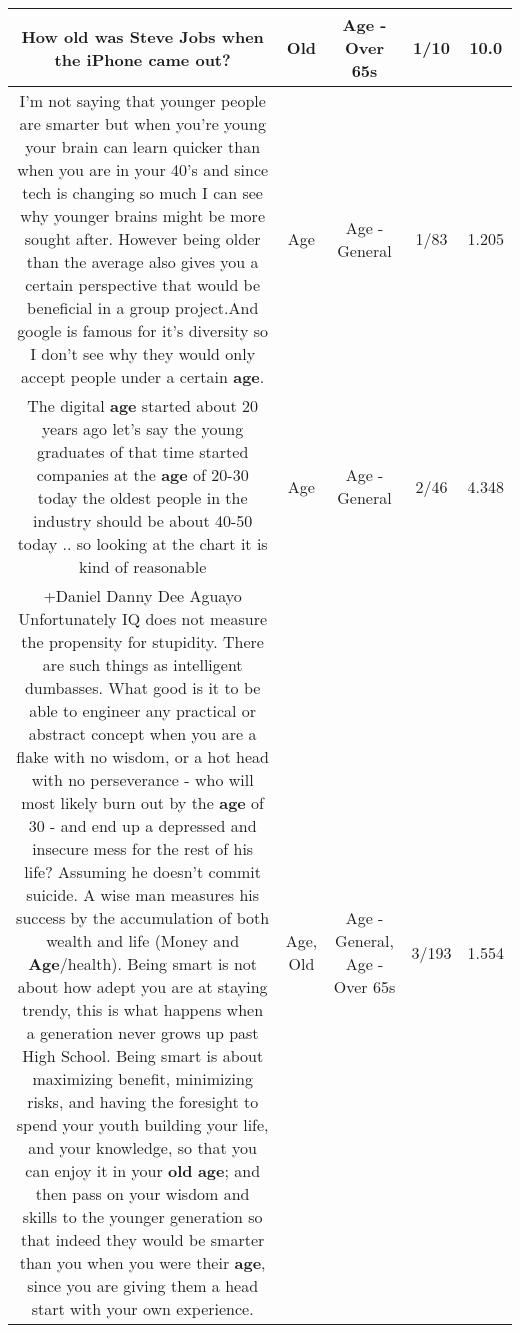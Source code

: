 \documentclass[11pt]{article}
\newlength\mylength
\begin{document}
\begin{center}
\begin{longtable}{|C{.65\mylength}|C{.30\mylength}|C{.12\mylength}|C{.12\mylength}|C{.12\mylength}|}
  \small How \textbf{old} was Steve Jobs when the iPhone came out?\normalsize   & Old & Age - Over 65s & 1/10 & 10.0 \\  \hline
  \small I'm not saying that younger people are smarter but when you're young your brain can learn quicker than when you are in your 40's and since tech is changing so much I can see why younger brains might be more sought after. However being older than the average also gives you a certain perspective that would be beneficial in a group project.And google is famous for it's diversity so I don't see why they would only accept people under a certain \textbf{age}.\normalsize   & Age & Age - General & 1/83 & 1.205 \\  \hline
  \small The digital \textbf{age} started about 20 years ago let's say the young graduates of that time started companies at the \textbf{age} of 20-30 today the oldest people in the industry  should be about 40-50 today .. so looking at the chart it is kind of reasonable\normalsize   & Age & Age - General & 2/46 & 4.348 \\  \hline
  \small +Daniel Danny Dee Aguayo Unfortunately IQ does not measure the propensity for stupidity. There are such things as intelligent dumbasses. What good is it to be able to engineer any practical or abstract concept when you are a flake with no wisdom, or a hot head with no perseverance - who will most likely burn out by the \textbf{age} of 30 - and end up a depressed and insecure mess for the rest of his life? Assuming he doesn't commit suicide. A wise man measures his success by the accumulation of both wealth and life (Money and \textbf{Age}/health). Being smart is not about how adept you are at staying trendy, this is what happens when a generation never grows up past High School. Being smart is about maximizing benefit, minimizing risks, and having the foresight to spend your youth building your life, and your knowledge, so that you can enjoy it in your \textbf{old} \textbf{age}; and then pass on your wisdom and skills to the younger generation so that indeed they would be smarter than you when you were their \textbf{age}, since you are giving them a head start with your own experience.\normalsize   & Age, Old & Age - General, Age - Over 65s & 3/193 & 1.554 \\  \hline

\end{longtable}
\end{center}
\end{document}
